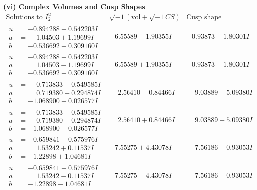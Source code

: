 \documentclass[1p]{elsarticle_modified}
\theoremstyle{definition}
\newcommand{\I}{\sqrt{-1}}
\begin{document}
\newpage\flushleft \textbf{(vi) Complex Volumes and Cusp Shapes}
$$\begin{array}{c|c|c}  
\text{Solutions to }I^u_{2}& \I (\text{vol} + \sqrt{-1}CS) & \text{Cusp shape}\\
 \hline 
\begin{aligned}
u &= -0.894288 + 0.542203 I \\
a &= \phantom{-}1.04503 + 1.19699 I \\
b &= -0.536692 - 0.309160 I\end{aligned}
 & -6.55589 - 1.90355 I & -0.93873 + 1.80301 I \\ \hline\begin{aligned}
u &= -0.894288 - 0.542203 I \\
a &= \phantom{-}1.04503 - 1.19699 I \\
b &= -0.536692 + 0.309160 I\end{aligned}
 & -6.55589 + 1.90355 I & -0.93873 - 1.80301 I \\ \hline\begin{aligned}
u &= \phantom{-}0.713833 + 0.549585 I \\
a &= \phantom{-}0.719380 + 0.294874 I \\
b &= -1.068900 + 0.026577 I\end{aligned}
 & \phantom{-}2.56410 - 0.84466 I & \phantom{-}9.03889 + 5.09380 I \\ \hline\begin{aligned}
u &= \phantom{-}0.713833 - 0.549585 I \\
a &= \phantom{-}0.719380 - 0.294874 I \\
b &= -1.068900 - 0.026577 I\end{aligned}
 & \phantom{-}2.56410 + 0.84466 I & \phantom{-}9.03889 - 5.09380 I \\ \hline\begin{aligned}
u &= -0.659841 + 0.575976 I \\
a &= \phantom{-}1.53242 + 0.11537 I \\
b &= -1.22898 + 1.04681 I\end{aligned}
 & -7.55275 + 4.43078 I & \phantom{-}7.56186 - 0.93053 I \\ \hline\begin{aligned}
u &= -0.659841 - 0.575976 I \\
a &= \phantom{-}1.53242 - 0.11537 I \\
b &= -1.22898 - 1.04681 I\end{aligned}
 & -7.55275 - 4.43078 I & \phantom{-}7.56186 + 0.93053 I \\ \hline\begin{aligned}

\end{aligned}
\end{array}$$
\end{document}
